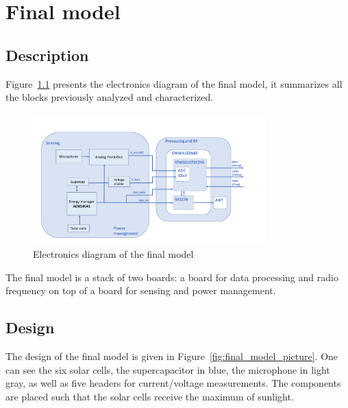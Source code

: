 \documentclass{EPL-master-thesis-covers-EN}
\begin{document}
\chapter{Final model}

\section{Description}

Figure~\ref{fig:electronics_diagram} presents the electronics diagram of the final model, it summarizes all the blocks previously analyzed and characterized.

\begin{figure}[H]
    \centering
    \includegraphics[width=0.8\textwidth]{electronics_diagram.pdf}
    \caption{Electronics diagram of the final model}
    \label{fig:electronics_diagram}
\end{figure}

The final model is a stack of two boards: a board for data processing and radio frequency on top of a board for sensing and power management.

\section{Design}

The design of the final model is given in Figure~\ref{fig:final_model_picture}. One can see the six solar cells, the supercapacitor in blue, the microphone in light gray, as well as five headers for current/voltage measurements. The components are placed such that the solar cells receive the maximum of sunlight.
\end{document}
